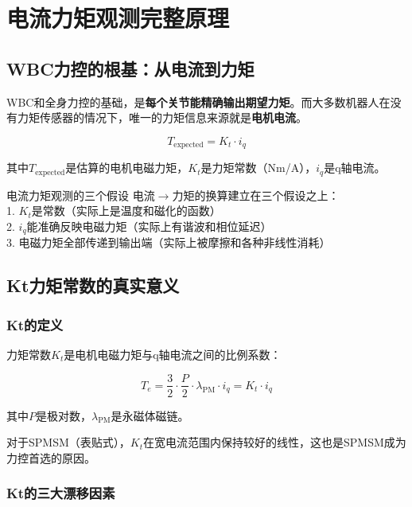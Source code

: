 \chapter{电流力矩观测完整原理}
\label{ch:current_torque}

\section{WBC力控的根基：从电流到力矩}

WBC和全身力控的基础，是\textbf{每个关节能精确输出期望力矩}。而大多数机器人在没有力矩传感器的情况下，唯一的力矩信息来源就是\textbf{电机电流}。

\begin{equation}
T_{\text{expected}} = K_t \cdot i_q
\end{equation}

其中$T_{\text{expected}}$是估算的电机电磁力矩，$K_t$是力矩常数（Nm/A），$i_q$是q轴电流。

\begin{keyinsight}{电流力矩观测的三个假设}
电流$\rightarrow$力矩的换算建立在三个假设之上：\\
1. $K_t$是常数（实际上是温度和磁化的函数）\\
2. $i_q$能准确反映电磁力矩（实际上有谐波和相位延迟）\\
3. 电磁力矩全部传递到输出端（实际上被摩擦和各种非线性消耗）
\end{keyinsight}

\section{Kt力矩常数的真实意义}

\subsection{Kt的定义}

力矩常数$K_t$是电机电磁力矩与q轴电流之间的比例系数：

\begin{equation}
T_e = \frac{3}{2} \cdot \frac{P}{2} \cdot \lambda_{\text{PM}} \cdot i_q = K_t \cdot i_q
\end{equation}

其中$P$是极对数，$\lambda_{\text{PM}}$是永磁体磁链。

对于SPMSM（表贴式），$K_t$在宽电流范围内保持较好的线性，这也是SPMSM成为力控首选的原因。

\subsection{Kt的三大漂移因素}

